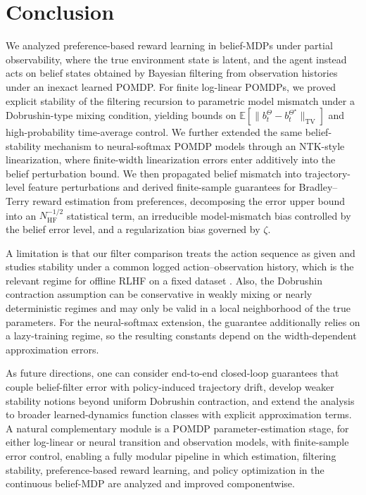 \documentclass[10pt]{article} %
\theoremstyle{plain}
\theoremstyle{definition}
\theoremstyle{remark}
\newcommand{\bE}{\mathbb{E}}
\begin{document}
\section{Conclusion}
\label{sec:conclusion}
We analyzed preference-based reward learning in belief-MDPs under partial observability, where the true environment state is latent, and the agent instead acts on belief states obtained by Bayesian filtering from observation histories under an inexact learned POMDP. For finite log-linear POMDPs, we proved explicit stability of the filtering recursion to parametric model mismatch under a Dobrushin-type mixing condition, yielding bounds on $\bE[\|b_t^\Theta-b_t^{\Theta^\star}\|_{\mathrm{TV}}]$ and high-probability time-average control. We further extended the same belief-stability mechanism to neural-softmax POMDP models through an NTK-style linearization, where finite-width linearization errors enter additively into the belief perturbation bound. We then propagated belief mismatch into trajectory-level feature perturbations and derived finite-sample guarantees for Bradley--Terry reward estimation from preferences, decomposing the error upper bound into an $N_{\mathrm{HF}}^{-1/2}$ statistical term, an irreducible model-mismatch bias controlled by the belief error level, and a regularization bias governed by $\zeta$.

A limitation is that our filter comparison treats the action sequence as given and studies stability under a common logged action--observation history, which is the relevant regime for offline RLHF on a fixed dataset \cite{kaufmann2025a}. Also, the Dobrushin contraction assumption can be conservative in weakly mixing or nearly deterministic regimes and may only be valid in a local neighborhood of the true parameters. For the neural-softmax extension, the guarantee additionally relies on a lazy-training regime, so the resulting constants depend on the width-dependent approximation errors.

As future directions, one can consider end-to-end closed-loop guarantees that couple belief-filter error with policy-induced trajectory drift, develop weaker stability notions beyond uniform Dobrushin contraction, and extend the analysis to broader learned-dynamics function classes with explicit approximation terms. A natural complementary module is a POMDP parameter-estimation stage, for either log-linear or neural transition and observation models, with finite-sample error control, enabling a fully modular pipeline in which estimation, filtering stability, preference-based reward learning, and policy optimization in the continuous belief-MDP are analyzed and improved componentwise.
\end{document}
